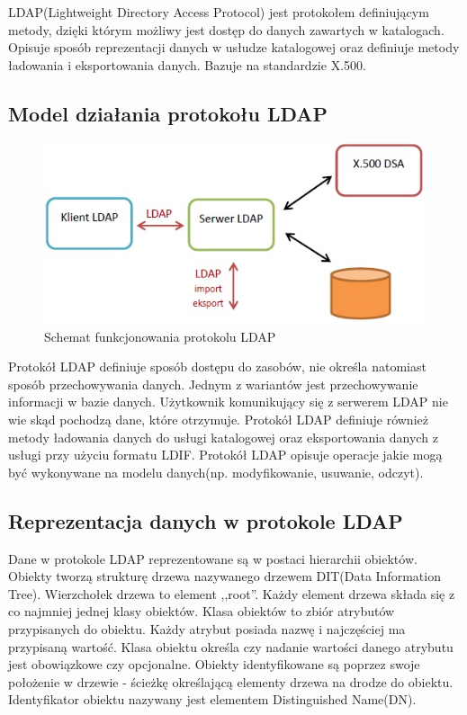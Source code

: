 	LDAP(Lightweight Directory Access Protocol) jest protokołem definiującym metody, dzięki którym możliwy jest dostęp do danych zawartych w katalogach\cite{ZyTrax13}. Opisuje sposób reprezentacji danych w usłudze katalogowej oraz definiuje metody ładowania i eksportowania danych. Bazuje na standardzie X.500.

	\subsection{Model działania protokołu LDAP}

		\begin{figure}[h]
			\centering
			\includegraphics{img/ldap.jpg}
			\caption{Schemat funkcjonowania protokolu  LDAP}
			\label{Schemat funkcjonowania protokolu  LDAP}
		\end{figure}

		Protokół LDAP definiuje sposób dostępu do zasobów, nie określa natomiast sposób przechowywania danych. Jednym z wariantów jest przechowywanie informacji w bazie danych. Użytkownik komunikujący się z serwerem LDAP nie wie skąd pochodzą dane, które otrzymuje. Protokół LDAP definiuje również metody ładowania danych do usługi katalogowej oraz eksportowania danych z usługi przy użyciu formatu LDIF. Protokół LDAP opisuje operacje jakie mogą być wykonywane na modelu danych(np. modyfikowanie, usuwanie, odczyt).

	\subsection{Reprezentacja danych w protokole LDAP}

		Dane w protokole LDAP reprezentowane są w postaci hierarchii obiektów\cite{ZyTrax13}. Obiekty tworzą strukturę drzewa nazywanego drzewem DIT(Data Information Tree). Wierzchołek drzewa to element ,,root''. Każdy element drzewa składa się z co najmniej jednej klasy obiektów. Klasa obiektów to zbiór atrybutów przypisanych do obiektu. Każdy atrybut posiada nazwę i najczęściej ma przypisaną wartość. Klasa obiektu określa czy nadanie wartości danego atrybutu jest obowiązkowe czy opcjonalne. Obiekty identyfikowane są poprzez swoje położenie w drzewie - ścieżkę określającą elementy drzewa na drodze do obiektu. Identyfikator obiektu nazywany jest elementem Distinguished Name(DN).

